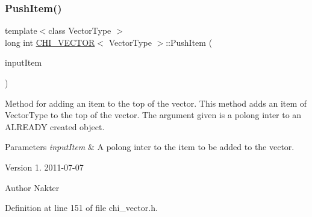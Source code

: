 \subsubsection{\texorpdfstring{Push\+Item()}{PushItem()}}
{\footnotesize\ttfamily template$<$class Vector\+Type $>$ \\
long int \hyperlink{class_c_h_i___v_e_c_t_o_r}{C\+H\+I\+\_\+\+V\+E\+C\+T\+OR}$<$ Vector\+Type $>$\+::Push\+Item (\begin{DoxyParamCaption}\item[{Vector\+Type\+Ptr}]{input\+Item }\end{DoxyParamCaption})}

Method for adding an item to the top of the vector. This method adds an item of Vector\+Type to the top of the vector. The argument given is a polong inter to an A\+L\+R\+E\+A\+DY created object.


\begin{DoxyParams}{Parameters}
{\em input\+Item} & A polong inter to the item to be added to the vector.\\
\hline
\end{DoxyParams}
\begin{DoxyVersion}{Version}
1. 2011-\/07-\/07 
\end{DoxyVersion}
\begin{DoxyAuthor}{Author}
Nakter 
\end{DoxyAuthor}


Definition at line 151 of file chi\+\_\+vector.\+h.


